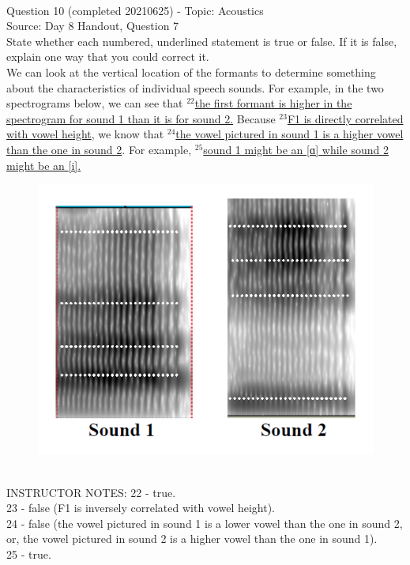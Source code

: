 \documentclass[12pt]{article}
\begin{document}
~\\

{\large Question 10} (completed 20210625) - Topic: Acoustics\\
Source: Day 8 Handout, Question 7\\

State whether each numbered, underlined statement is true or false. If it is false, explain one way that you could correct it.\\

We can look at the vertical location of the formants to determine something about the characteristics of individual speech sounds. For example, in the two spectrograms below, we can see that $^{22}$\ul{the first formant is higher in the spectrogram for sound 1 than it is for sound 2.} Because $^{23}$\ul{F1 is directly correlated with vowel height}, we know that $^{24}$\ul{the vowel pictured in sound 1 is a higher vowel than the one in sound 2}. For example, $^{25}$\ul{sound 1 might be an {[ɑ]} while sound 2 might be an {[i]}.}

\begin{figure}[H]
\includegraphics{../images/sound1a_sound2i.png}
\end{figure}

~\\
INSTRUCTOR NOTES: 22 - true. \\23 - false (F1 is inversely correlated with vowel height). \\24 - false (the vowel pictured in sound 1 is a lower vowel than the one in sound 2, or, the vowel pictured in sound 2 is a higher vowel than the one in sound 1).\\25 - true.
\end{document}
